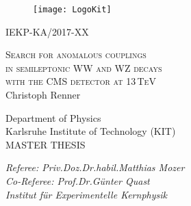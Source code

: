 \begin{titlepage}
  \begin{addmargin}[0cm]{0cm}
    \thispagestyle{empty}
    \vspace{-1cm}
    \begin{center}

	\begin{figure}[htbp]
  		\centering
  		\hspace{26pt}
  		\texttt{[image: LogoKit]}
	\end{figure}

	\hspace{8cm}IEKP-KA/2017-XX\\%

	\vspace{0.8cm}

	\Large{\textsc{Search for anomalous couplings\\in semileptonic WW and WZ decays\\with the CMS detector at 13\,TeV}}\\
	\vspace{0.9cm}
	\Large{Christoph Renner}\\
	\vspace{0.9cm}
	\vspace{1cm}
	\large{Department of Physics\\
  
    Karlsruhe Institute of Technology (KIT)\\
    \vspace{0.825 cm}
    \large{MASTER THESIS}\\
    \vspace{0.825 cm}

    \large{\textit{Referee: Priv.\;Doz.\;Dr.\;habil.\;Matthias Mozer}}\\
	\large{\textit{Co-Referee: Prof.\;Dr.\;G\"unter Quast}}\\
    \vspace{0.2 cm}
	\large{\textit{Institut f\"ur Experimentelle Kernphysik}}\\


}
\end{center}
\end{addmargin}
\end{titlepage}
